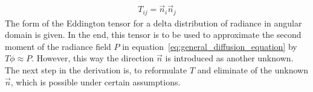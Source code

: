 \begin{align}
T_{ij} = \vec{n}_i\vec{n}_j
\label{eq:iso_delta_T}
\end{align}
The form of the Eddington tensor for a delta distribution of radiance in angular domain is given. In the end, this tensor is to be used to approximate the second moment of the radiance field $P$ in equation~\ref{eq:general_diffusion_equation} by $T\phi\approx P$. However, this way the direction $\vec{n}$ is introduced as another unknown. The next step in the derivation is, to reformulate $T$ and eliminate of the unknown $\vec{n}$, which is possible under certain assumptions.

